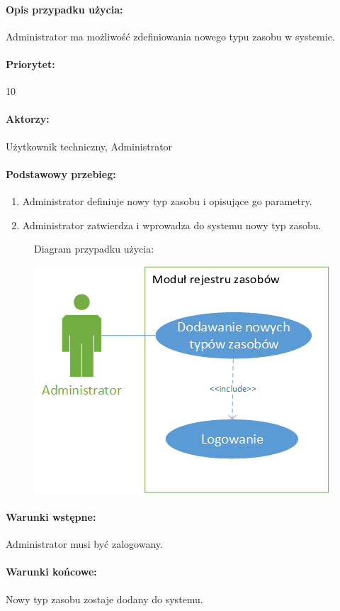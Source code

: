 \documentclass[11pt, a4paper, oneside]{report}
\begin{document}
\paragraph{Opis przypadku użycia:} 
Administrator ma możliwość zdefiniowania nowego typu zasobu w systemie.
\paragraph{Priorytet:} 10
\paragraph{Aktorzy:} Użytkownik techniczny, Administrator
\paragraph{Podstawowy przebieg:}
\begin{enumerate}
\item Administrator definiuje nowy typ zasobu i opisujące go parametry.
\item Administrator zatwierdza i wprowadza do systemu nowy typ zasobu. 
\end{enumerate}

\begin{figure}[H]
Diagram przypadku użycia:

\centering
\includegraphics[scale=0.8]{admin_dodawanie_typow.png}
\end{figure}

\paragraph{Warunki wstępne:} Administrator musi być zalogowany.
\paragraph{Warunki końcowe:} Nowy typ zasobu zostaje dodany do systemu.
\end{document}
